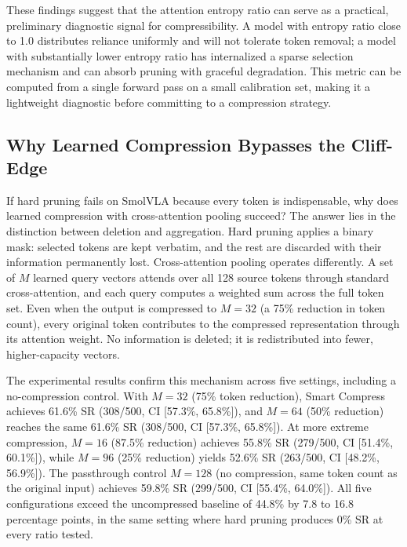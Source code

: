 These findings suggest that the attention entropy ratio can serve as a practical, preliminary diagnostic signal for compressibility. A model with entropy ratio close to 1.0 distributes reliance uniformly and will not tolerate token removal; a model with substantially lower entropy ratio has internalized a sparse selection mechanism and can absorb pruning with graceful degradation. This metric can be computed from a single forward pass on a small calibration set, making it a lightweight diagnostic before committing to a compression strategy.

\subsection{Why Learned Compression Bypasses the Cliff-Edge}
\label{sec:learned_compression}

If hard pruning fails on SmolVLA because every token is indispensable, why does learned compression with cross-attention pooling succeed? The answer lies in the distinction between deletion and aggregation. Hard pruning applies a binary mask: selected tokens are kept verbatim, and the rest are discarded with their information permanently lost. Cross-attention pooling operates differently. A set of $M$ learned query vectors attends over all 128 source tokens through standard cross-attention, and each query computes a weighted sum across the full token set. Even when the output is compressed to $M = 32$ (a 75\% reduction in token count), every original token contributes to the compressed representation through its attention weight. No information is deleted; it is redistributed into fewer, higher-capacity vectors.

The experimental results confirm this mechanism across five settings, including a no-compression control. With $M = 32$ (75\% token reduction), Smart Compress achieves 61.6\% SR (308/500, CI [57.3\%, 65.8\%]), and $M = 64$ (50\% reduction) reaches the same 61.6\% SR (308/500, CI [57.3\%, 65.8\%]). At more extreme compression, $M = 16$ (87.5\% reduction) achieves 55.8\% SR (279/500, CI [51.4\%, 60.1\%]), while $M = 96$ (25\% reduction) yields 52.6\% SR (263/500, CI [48.2\%, 56.9\%]). The passthrough control $M = 128$ (no compression, same token count as the original input) achieves 59.8\% SR (299/500, CI [55.4\%, 64.0\%]). All five configurations exceed the uncompressed baseline of 44.8\% by 7.8 to 16.8 percentage points, in the same setting where hard pruning produces 0\% SR at every ratio tested.

